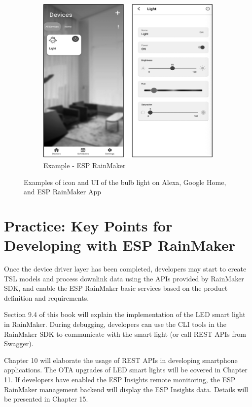 \documentclass[a4paper,12pt,openany]{book}
\begin{document}
\begin{figure}[h!]
\vspace{6pt}
\begin{subfigure}{0.55\textwidth}
\includegraphics[width=\textwidth]{D3Z/3-4-c}
\caption{Example - ESP RainMaker}
\end{subfigure}
\caption{\Centering Examples of icon and UI of the bulb light on Alexa, Google Home, and ESP RainMaker App}
\end{figure}

\section{Practice: Key Points for Developing with ESP RainMaker}
Once the device driver layer has been completed, developers may start to create TSL models and process downlink data using the APIs provided by RainMaker SDK, and enable the ESP RainMaker basic services based on the product definition and requirements.

Section 9.4 of this book will explain the implementation of the LED smart light in RainMaker. During debugging, developers can use the CLI tools in the RainMaker SDK to communicate with the smart light (or call REST APIs from Swagger).

Chapter 10 will elaborate the usage of REST APIs in developing smartphone applications. The OTA upgrades of LED smart lights will be covered in Chapter 11. If developers have enabled the ESP Insights remote monitoring, the ESP RainMaker management backend will display the ESP Insights data. Details will be presented in Chapter 15.
\end{document}
